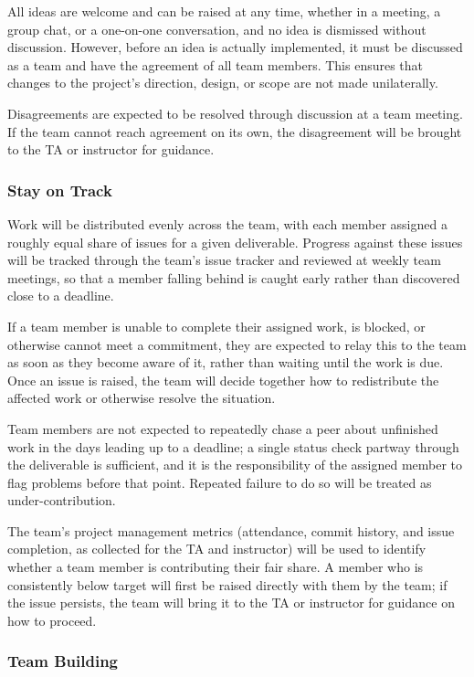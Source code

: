 \documentclass{article}
\begin{document}
All ideas are welcome and can be raised at any time, whether in a meeting, a group
chat, or a one-on-one conversation, and no idea is dismissed without discussion.
However, before an idea is actually implemented, it must be discussed as a team and
have the agreement of all team members. This ensures that changes to the project's
direction, design, or scope are not made unilaterally.

Disagreements are expected to be resolved through discussion at a team meeting. If
the team cannot reach agreement on its own, the disagreement will be brought to the
TA or instructor for guidance.

\subsubsection*{Stay on Track}

Work will be distributed evenly across the team, with each member assigned a
roughly equal share of issues for a given deliverable. Progress against these
issues will be tracked through the team's issue tracker and reviewed at weekly
team meetings, so that a member falling behind is caught early rather than
discovered close to a deadline.

If a team member is unable to complete their assigned work, is blocked, or
otherwise cannot meet a commitment, they are expected to relay this to the team
as soon as they become aware of it, rather than waiting until the work is due.
Once an issue is raised, the team will decide together how to redistribute the
affected work or otherwise resolve the situation.

Team members are not expected to repeatedly chase a peer about unfinished work in
the days leading up to a deadline; a single status check partway through the
deliverable is sufficient, and it is the responsibility of the assigned member to
flag problems before that point. Repeated failure to do so will be treated as
under-contribution.

The team's project management metrics (attendance, commit history, and issue
completion, as collected for the TA and instructor) will be used to identify
whether a team member is contributing their fair share. A member who is
consistently below target will first be raised directly with them by the team; if
the issue persists, the team will bring it to the TA or instructor for guidance
on how to proceed.

\subsubsection*{Team Building}
\end{document}
